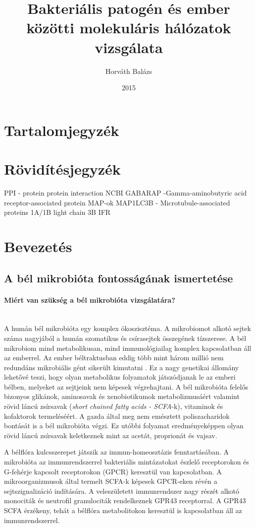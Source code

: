 \documentclass[a4paper,12pt]{article}
\title{Bakteriális patogén és ember közötti molekuláris hálózatok vizsgálata}
\author{Horváth Balázs}
\date{2015}
\begin{document}
\maketitle
\pagebreak

\section{Tartalomjegyzék}
\pagebreak

\section{Rövidítésjegyzék}
PPI - protein protein interaction 
NCBI
GABARAP -Gamma-aminobutyric acid receptor-associated protein
MAP-ok
MAP1LC3B - Microtubule-associated proteins 1A/1B light chain 3B
IFR
\pagebreak

\section{Bevezetés}
	\subsection{A bél mikrobióta fontosságának ismertetése}
		\paragraph{Miért van szükség a bél mikrobióta vizsgálatára?} \mbox{}\\
		A humán bél mikrobióta egy komplex ökoszisztéma. A mikrobiomot alkotó sejtek száma nagyjából a humán szomatikus és csírasejtek összegének tízszerese.  A bél mikrobiom mind metabolikusan, mind immunológiailag komplex kapcsolatban áll az emberrel.\cite{gut_microbiome} Az ember béltraktusban eddig több mint három millió nem redundáns mikrobiális gént sikerült kimutatni \cite{meta_omics}. Ez a nagy genetikai állomány lehetővé teszi, hogy olyan metabolikus folyamatok játszódjanak le az emberi bélben, melyeket az sejtjeink nem képesek végrehajtani. \cite{gut_microbiome} A bél mikrobióta felelős bizonyos glikánok, aminosavak és xenobiotikumok metabolizmusáért valamint rövid láncú zsírsavak (\textit{short chained fatty acids - SCFA}-k), vitaminok és kofaktorok termeléséért. A gazda által meg nem emésztett poliszacharidok bontását is a bél mikrobióta végzi. Ez utóbbi folyamat eredményeképpen olyan rövid láncú zsírsavak keletkeznek mint az acetát, proprionát és vajsav. \cite{scfa_and_vitamine}
		
		A bélflóra kulcsszerepet játszik az immun-homeosztázis fenntartásában. A mikrobióta az immunrendszerrel bakteriális mintázatokat észlelő receptorokon és G-fehérje kapcsolt receptorokon (GPCR) keresztül van kapcsolatban. A mikroorganizmusok által termelt SCFA-k képesek GPCR-eken révén a sejtszignalizáció indítására. A veleszületett immunrendszer nagy részét alkotó monociták és neutrofil granulociták rendelkeznek GPR43 receptorral. A GPR43 SCFA érzékeny, tehát a bélflóra metabolitokon keresztül is kapcsolatban áll az immunrendszerrel. \cite{buthyrate_immune}
		
\end{document}
